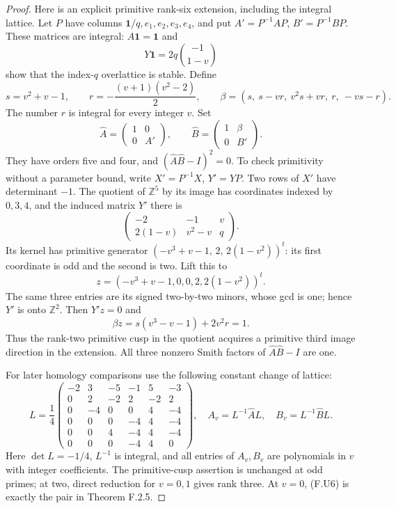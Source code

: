 \begin{proof}
Here is an explicit primitive rank-six extension, including
the integral lattice.  Let $P$ have columns
$\mathbf1/q,e_1,e_2,e_3,e_4$, and put
$A'=P^{-1}AP$, $B'=P^{-1}BP$.  These matrices are integral:
$A\mathbf1=\mathbf1$ and
\[
 Y\mathbf1=2q\binom{-1}{1-v}
\]
show that the index-$q$ overlattice is stable.  Define
\[
 s=v^2+v-1,\qquad r=-\frac{(v+1)(v^2-2)}2,
 \qquad
 \beta=(s,\ s-vr,\ v^2s+vr,\ r,\ -vs-r).
 \tag{F.U3}
\]
The number $r$ is integral for every integer $v$.
Set
\[
 \widehat A=\begin{pmatrix}1&0\\0&A'\end{pmatrix},
 \qquad
 \widehat B=\begin{pmatrix}1&\beta\\0&B'\end{pmatrix}.
 \tag{F.U4}
\]
They have orders five and four, and
$(\widehat A\widehat B-I)^2=0$.
To check primitivity without a parameter bound, write
$X'=P^{-1}X$, $Y'=YP$.  Two rows of $X'$ have determinant
$-1$.  The quotient of $\mathbb Z^5$ by its image has
coordinates indexed by $0,3,4$, and the induced matrix $Y'$
there is
\[
 \begin{pmatrix}-2&-1&v\\2(1-v)&v^2-v&q\end{pmatrix}.
\]
Its kernel has primitive generator
$(-v^3+v-1,\,2,\,2(1-v^2))^t$: its first coordinate is
odd and the second is two.  Lift this to
\[
 z=(-v^3+v-1,0,0,2,2(1-v^2))^t.
\]
The same three entries are its signed two-by-two minors,
whose gcd is one; hence $Y'$ is onto $\mathbb Z^2$.
Then $Y'z=0$ and
\[
 \beta z=s(v^3-v-1)+2v^2r=1.
 \tag{F.U5}
\]
Thus the rank-two primitive cusp in the quotient acquires a
primitive third image direction in the extension.  All three
nonzero Smith factors of $\widehat A\widehat B-I$ are one.

For later homology comparisons use the following constant
change of lattice:
\[
 L=\frac14\begin{pmatrix}
 -2&3&-5&-1&5&-3\\
 0&2&-2&2&-2&2\\
 0&-4&0&0&4&-4\\
 0&0&0&-4&4&-4\\
 0&0&4&-4&4&-4\\
 0&0&0&-4&4&0
 \end{pmatrix},\quad
 A_v=L^{-1}\widehat A L,\quad B_v=L^{-1}\widehat B L.
 \tag{F.U6}
\]
Here $\det L=-1/4$, $L^{-1}$ is integral, and all entries of
$A_v,B_v$ are polynomials in $v$ with integer coefficients.
The primitive-cusp assertion is unchanged at odd primes;
at two, direct reduction for $v=0,1$ gives rank three.
At $v=0$, (F.U6) is exactly the pair in Theorem F.2.5.


\end{proof}
